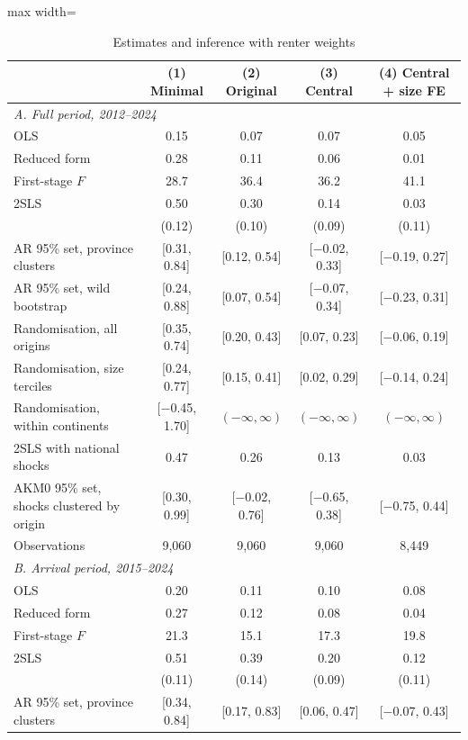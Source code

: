 \begin{table}[!htbp]\centering\small
\caption{Estimates and inference with renter weights}\label{tab:main_rent}
\begin{adjustbox}{max width=\linewidth}\begin{tabular}{lcccc}\toprule
 & (1) Minimal & (2) Original & (3) Central & (4) Central + size FE \\ \midrule
\multicolumn{5}{l}{\textit{A. Full period, 2012--2024}}\\
OLS & 0.15 & 0.07 & 0.07 & 0.05 \\
Reduced form & 0.28 & 0.11 & 0.06 & 0.01 \\
First-stage $F$ & 28.7 & 36.4 & 36.2 & 41.1 \\
2SLS & 0.50 & 0.30 & 0.14 & 0.03 \\
 & (0.12) & (0.10) & (0.09) & (0.11) \\
AR 95\% set, province clusters & [0.31, 0.84] & [0.12, 0.54] & [$-$0.02, 0.33] & [$-$0.19, 0.27] \\
AR 95\% set, wild bootstrap & [0.24, 0.88] & [0.07, 0.54] & [$-$0.07, 0.34] & [$-$0.23, 0.31] \\
Randomisation, all origins & [0.35, 0.74] & [0.20, 0.43] & [0.07, 0.23] & [$-$0.06, 0.19] \\
Randomisation, size terciles & [0.24, 0.77] & [0.15, 0.41] & [0.02, 0.29] & [$-$0.14, 0.24] \\
Randomisation, within continents & [$-$0.45, 1.70] & $(-\infty,\infty)$ & $(-\infty,\infty)$ & $(-\infty,\infty)$ \\
2SLS with national shocks & 0.47 & 0.26 & 0.13 & 0.03 \\
AKM0 95\% set, shocks clustered by origin & [0.30, 0.99] & [$-$0.02, 0.76] & [$-$0.65, 0.38] & [$-$0.75, 0.44] \\
Observations & 9,060 & 9,060 & 9,060 & 8,449 \\
\midrule
\multicolumn{5}{l}{\textit{B. Arrival period, 2015--2024}}\\
OLS & 0.20 & 0.11 & 0.10 & 0.08 \\
Reduced form & 0.27 & 0.12 & 0.08 & 0.04 \\
First-stage $F$ & 21.3 & 15.1 & 17.3 & 19.8 \\
2SLS & 0.51 & 0.39 & 0.20 & 0.12 \\
 & (0.11) & (0.14) & (0.09) & (0.11) \\
AR 95\% set, province clusters & [0.34, 0.84] & [0.17, 0.83] & [0.06, 0.47] & [$-$0.07, 0.43] \\

\end{tabular}
\end{adjustbox}
\end{table}
